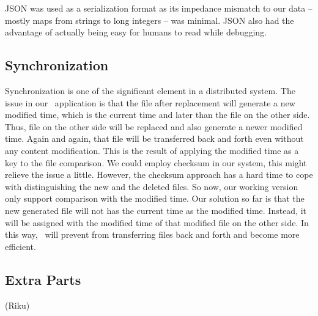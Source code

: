 JSON was used as a serialization format as its impedance mismatch to our data – mostly maps from strings to long integers – was minimal.  JSON also had the advantage of actually being easy for humans to read while debugging.



\subsection{Synchronization}
Synchronization is one of the significant element in a distributed system. The issue in our \teledroid\ application is that the file after replacement will generate a new modified time, which is the current time and later than the file on the other side. Thus, file on the other side will be replaced and also generate a newer modified time. Again and again, that file will be transferred back and forth even without any content modification. This is the result of applying the modified time as a key to the file comparison. We could employ checksum in our system, this might relieve the issue a little. However, the checksum approach has a hard time to cope with distinguishing the new and the deleted files. So now, our working version only support comparison with the modified time. Our solution so far is that the new generated file will not has the current time as the modified time. Instead, it will be assigned with the modified time of that modified file on the other side. In this way, \teledroid\ will prevent from transferring files back and forth and become more efficient.

\subsection{Extra Parts}
(Riku)
